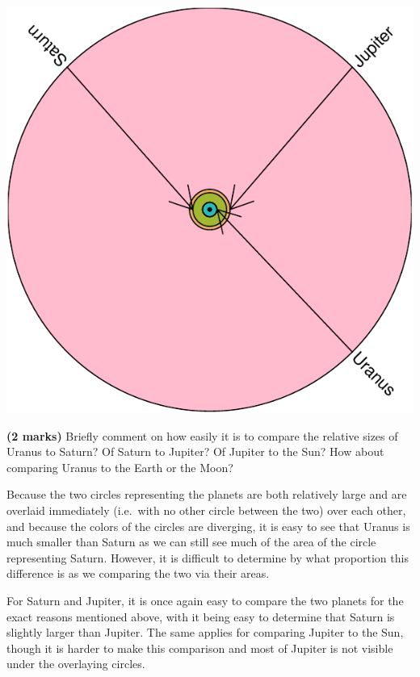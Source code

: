 \documentclass[9pt,letter]{article}
\begin{document}
\begin{center}\includegraphics{a3_tests_files/figure-latex/unnamed-chunk-3-1} \end{center}

\item 

\textbf{(2 marks)} Briefly comment on how easily it is to compare the
relative sizes of Uranus to Saturn? Of Saturn to Jupiter? Of Jupiter to
the Sun? How about comparing Uranus to the Earth or the Moon?

Because the two circles representing the planets are both relatively
large and are overlaid immediately (i.e.~with no other circle between
the two) over each other, and because the colors of the circles are
diverging, it is easy to see that Uranus is much smaller than Saturn as
we can still see much of the area of the circle representing Saturn.
However, it is difficult to determine by what proportion this difference
is as we comparing the two via their areas.

For Saturn and Jupiter, it is once again easy to compare the two planets
for the exact reasons mentioned above, with it being easy to determine
that Saturn is slightly larger than Jupiter. The same applies for
comparing Jupiter to the Sun, though it is harder to make this
comparison and most of Jupiter is not visible under the overlaying
circles.
\end{document}
